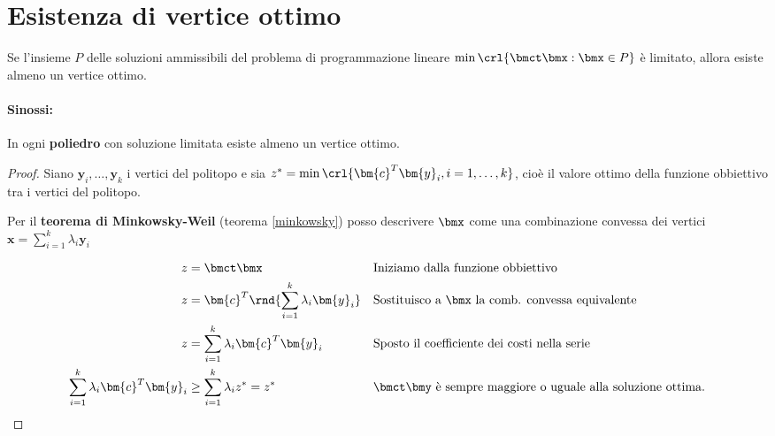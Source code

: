 \documentclass[\main/main.tex]{subfiles}
\begin{document}
\section{Esistenza di vertice ottimo}

\begin{theorem}
  Se l'insieme $P$ delle soluzioni ammissibili del problema di programmazione lineare $\min\crl{\bmct\bmx:\bmx\in P}$ è limitato, allora esiste almeno un vertice ottimo.
  \paragraph*{Sinossi:} In ogni \textbf{poliedro} con soluzione limitata esiste almeno un vertice ottimo.
\end{theorem}

\begin{proof}
  Siano $\bm{y}_i, \ldots, \bm{y}_k$ i vertici del politopo e sia $z^* = \min \crl{\bm{c}^T\bm{y}_i, i=1,\ldots,k}$, cioè il valore ottimo della funzione obbiettivo tra i vertici del politopo.

  Per il \textbf{teorema di Minkowsky-Weil} (teorema \ref{minkowsky}) posso descrivere $\bmx$ come una combinazione convessa dei vertici $\bm{x} = \sum_{i=1}^k \lambda_i \bm{y}_i$

  \begin{align*}
    z                                       & = \bmct \bmx                                    &  & \text{Iniziamo dalla funzione obbiettivo}                             \\
    z                                       & = \bm{c}^T\rnd{\sum_{i=1}^k \lambda_i \bm{y}_i} &  & \text{Sostituisco a $\bmx$ la comb. convessa equivalente}             \\
    z                                       & = \sum_{i=1}^k \lambda_i \bm{c}^T\bm{y}_i       &  & \text{Sposto il coefficiente dei costi nella serie}                   \\
    \sum_{i=1}^k \lambda_i \bm{c}^T\bm{y}_i & \geq \sum_{i=1}^k  \lambda_i z^* = z^*          &  & \text{$\bmct \bmy$ è sempre maggiore o uguale alla soluzione ottima.} \\
  \end{align*}
\end{proof}
\end{document}
